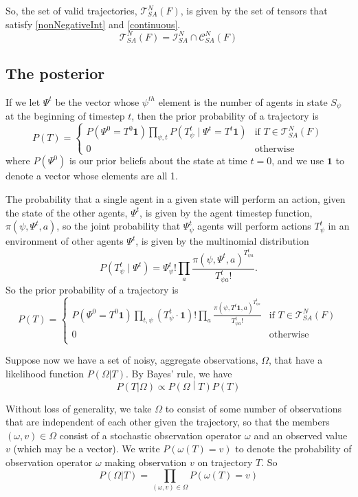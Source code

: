\documentclass{article}
\begin{document}
So, the set of valid trajectories, $\mathcal{T}^N_{SA}(F)$, is given by the set of tensors that satisfy \eqref{nonNegativeInt} and \eqref{continuous}.
\begin{equation}
\mathcal{T}^N_{SA}(F) = \mathcal{I}^N_{SA} \cap \mathcal{C}^N_{SA}(F)
\end{equation}


\subsection{The posterior}

If we let $\Psi^t$ be the vector whose $\psi^{th}$ element is the number of agents in state $S_\psi$ at the beginning of timestep $t$, then the prior probability of a trajectory is
\[
P(T) =
\begin{cases}
P\left(\Psi^0 = T^0 \mathbf{1} \right) \prod_{\psi, t} P\left(T^t_{\psi} \mid \Psi^t = T^t \mathbf{1}\right) & \text{if } T \in \mathcal{T}^N_{SA}(F) \\
0 & \text{otherwise}
\end{cases}
\]
where $P(\Psi^0)$ is our prior beliefs about the state at time $t=0$, and we use $\mathbf{1}$ to denote a vector whose elements are all 1.


The probability that a single agent in a given state will perform an action, given the state of the other agents, $\Psi^t$, is given by the agent timestep function, $\pi(\psi,\Psi^t,a)$, so the joint probability that $\Psi^t_\psi$ agents will perform actions $T^t_{\psi}$ in an environment of other agents $\Psi^t$, is given by the multinomial distribution
\[
P\left(T^t_{\psi} \mid \Psi^t \right) = \Psi^t_\psi!\prod_a \frac{\pi(\psi,\Psi^t,a)^{T^{t}_{\psi a}}}{T^{t}_{\psi a}!}.
\]
So the prior probability of a trajectory is
\[
P(T) =
\begin{cases}
P(\Psi^0 = T^0\mathbf{1})
\prod_{t, \psi}\left(T^t_{\psi} \cdot \mathbf{1} \right)!
\prod_a \frac{\pi(\psi, T^{t}\mathbf{1},a)^{T^{t}_{\psi a}}}{T^{t}_{\psi a}!} & \text{if } T \in \mathcal{T}^N_{SA}(F) \\
0 & \text{otherwise}\\
\end{cases}
\]

Suppose now we have a set of noisy, aggregate observations, $\Omega$, that have a likelihood function $P(\Omega|T)$. By Bayes' rule, we have
\[
P(T|\Omega) \propto P\left(\Omega \middle| T\right)P(T)
\]

Without loss of generality, we take $\Omega$ to consist of some number of observations that are independent of each other given the trajectory, so that the members $(\omega,v)\in \Omega$ consist of a stochastic observation operator $\omega$ and an observed value $v$ (which may be a vector). We write $P(\omega(T)=v)$ to denote the probability of observation operator $\omega$ making observation $v$ on trajectory $T$. So
\[
P(\Omega|T) = \prod_{(\omega,v) \in \Omega} P(\omega(T)=v)
\]
\end{document}
